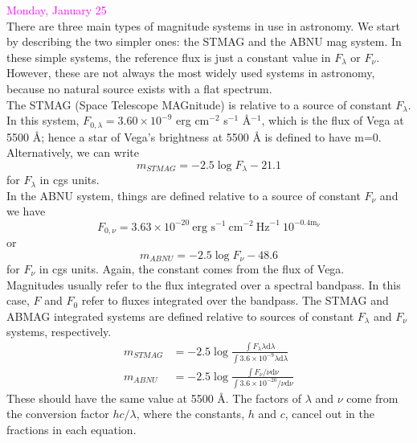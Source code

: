 \documentclass[12pt]{article}
\begin{document}
\noindent \textcolor{magenta}{Monday, January 25}\\

\noindent There are three main types of magnitude systems in use in astronomy.
We start by describing the two simpler ones: the STMAG and the ABNU mag system.
In these simple systems, the reference flux is just a constant value in
$F_{\lambda}$ or $F_{\nu}$. However, these are not always the most widely used
systems in astronomy, because no natural source exists with a flat spectrum.\\

\noindent The STMAG (Space Telescope MAGnitude) is relative to a source of
constant $F_{\lambda}$. In this system, $F_{0,\lambda} = 3.60 \times 10^{-9}$
erg cm$^{-2}$ s$^{-1}$ \AA{}$^{-1}$, which is the flux of Vega at
5500 \AA{}; hence a star of Vega's brightness at 5500 \AA{} is defined to
have m=0. Alternatively, we can write
\begin{equation*}
    m_{STMAG} = -2.5 \log F_{\lambda} - 21.1
\end{equation*}
for $F_{\lambda}$ in cgs units.\\

\noindent In the ABNU system, things are defined relative to a source
of constant $F_{\nu}$ and we have
\begin{equation*}
    F_{0,\nu} = 3.63 \times 10^{-20}\ \textrm{erg\ s}^{-1}\
    \textrm{cm}^{-2}\ \textrm{Hz}^{-1}\ 10^{-0.4 \textrm{m}_{\nu}}
\end{equation*}
or
\begin{equation*}
    m_{ABNU} = -2.5 \log F_{\nu} - 48.6
\end{equation*}
for $F_{\nu}$ in cgs units. Again, the constant comes from the flux of
Vega.\\

\noindent Magnitudes usually refer to the flux integrated over a
spectral bandpass. In this case, $F$ and $F_0$ refer to fluxes
integrated over the bandpass. The STMAG and ABMAG integrated systems
are defined relative to sources of constant $F_{\lambda}$ and
$F_{\nu}$ systems, respectively.
\begin{align*}
    m_{STMAG} &= -2.5 \log \frac{\int F_{\lambda} \lambda
    \textrm{d}\lambda}{\int3.6\times10^{-9}\lambda\textrm{d}\lambda}\\
    m_{ABNU} &= -2.5 \log \frac{\int F_{\nu}/ \nu
    \textrm{d}\nu}{\int 3.6 \times 10^{-20}/ \nu\textrm{d}\nu}
\end{align*}
These should have the same value at 5500 \AA{}.
The factors of $\lambda$ and $\nu$ come from the conversion factor
$hc/\lambda$, where the constants, $h$ and $c$, cancel out in the
fractions in each equation.\\
\end{document}
